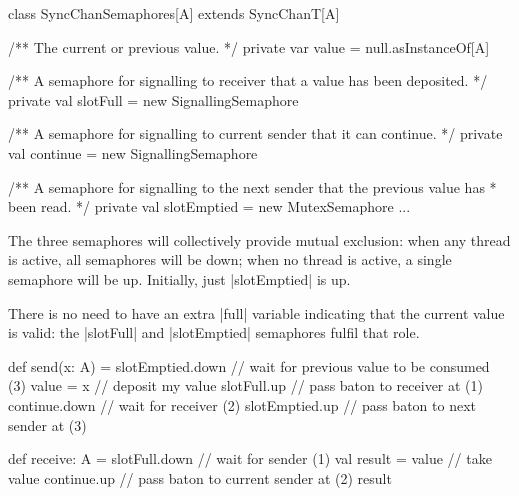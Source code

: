 

\begin{slide}

\begin{scala}
class SyncChanSemaphores[A] extends SyncChanT[A]{  
  /** The current or previous value. */
  private var value = null.asInstanceOf[A]

  /** A semaphore for signalling to receiver that a value has been deposited. */
  private val slotFull = new SignallingSemaphore

  /** A semaphore for signalling to current sender that it can continue. */
  private val continue = new SignallingSemaphore

  /** A semaphore for signalling to the next sender that the previous value has
    * been read. */
  private val slotEmptied = new MutexSemaphore
  ...
}
\end{scala}
\end{slide}


\begin{slide}

The three semaphores will collectively provide mutual exclusion: when any
thread is active, all semaphores will be down; when no thread is active, a
single semaphore will be up.  Initially, just |slotEmptied| is up.

There is no need to have an extra |full| variable indicating that the current
value is valid: the |slotFull| and |slotEmptied| semaphores fulfil that role. 
\end{slide}


\begin{slide}

\begin{scala}
  def send(x: A) = {
    slotEmptied.down       // wait for previous value to be consumed (3)
    value = x               // deposit my value
    slotFull.up             // pass baton to receiver at (1)
    continue.down           // wait for receiver (2)
    slotEmptied.up          // pass baton to next sender at (3)
  }

  def receive: A = {
    slotFull.down           // wait for sender (1)
    val result = value      // take value
    continue.up             // pass baton to current sender at (2)
    result
  }
\end{scala}
\end{slide}

